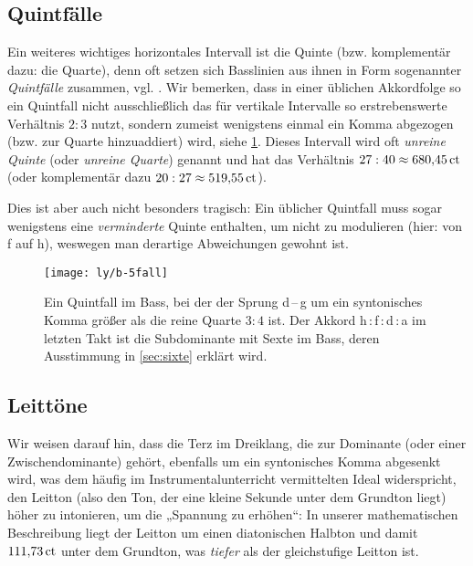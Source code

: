 \subsection{Quintfälle}

Ein weiteres wichtiges horizontales Intervall ist die Quinte (bzw. komplementär
dazu: die Quarte), denn oft setzen sich Basslinien aus ihnen in Form sogenannter
\emph{Quintfälle} zusammen, vgl. \cite[{}12.3]{Skript}. Wir bemerken, dass in
einer üblichen Akkordfolge so ein Quintfall nicht ausschließlich das für
vertikale Intervalle so erstrebenswerte Verhältnis $2:3$ nutzt, sondern zumeist
wenigstens einmal ein Komma abgezogen (bzw. zur Quarte hinzuaddiert) wird, siehe
\cref{fig:5fall}. Dieses Intervall wird oft \emph{unreine Quinte} (oder
\emph{unreine Quarte}) genannt und hat das Verhältnis $27:40 \approx 680{,}45\,\text{ct}$
(oder komplementär dazu $20:27 \approx 519{,}55\,\text{ct}$).

Dies ist aber auch nicht besonders tragisch: Ein üblicher Quintfall muss sogar
wenigstens eine \emph{verminderte} Quinte enthalten, um nicht zu modulieren
(hier: von \naturalp f auf h), weswegen man derartige Abweichungen gewohnt ist.

\begin{figure}
  \centering
  \texttt{[image: ly/b-5fall]}
  \caption{Ein Quintfall im Bass, bei der der Sprung d\,–\,\naturalp g um ein
    syntonisches Komma größer als die reine Quarte $3:4$ ist.  Der Akkord
    h\,:\,\naturalp f\,:\,d\,:\,a im letzten Takt ist die Subdominante mit Sexte
    im Bass, deren Ausstimmung in \cref{sec:sixte} erklärt wird.}\label{fig:5fall}
\end{figure}

\subsection{Leittöne}
\label{sec:ln}

Wir weisen darauf hin, dass die Terz im Dreiklang, die zur Dominante (oder einer
Zwischendominante) gehört, ebenfalls um ein syntonisches Komma abgesenkt wird,
was dem häufig im Instrumentalunterricht vermittelten Ideal widerspricht, den
Leitton (also den Ton, der eine kleine Sekunde unter dem Grundton liegt) höher
zu intonieren, um die „Spannung zu erhöhen“: In unserer mathematischen
Beschreibung liegt der Leitton um einen diatonischen Halbton und damit
$111{,}73\,\text{ct}$ unter dem Grundton, was \emph{tiefer} als der gleichstufige
Leitton ist.

